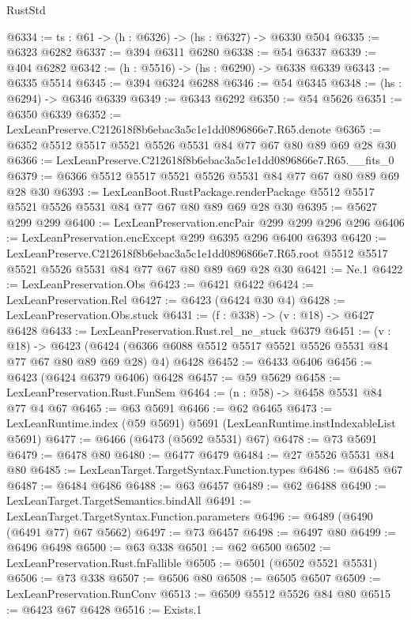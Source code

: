 \begin{lexlean}{RustStd}
\begin{coremodule}
@6334 := {ts : @61} -> (h : @6326) -> (hs : @6327) -> @6330 @504
@6335 := @6323 @6282
@6337 := @394 @6311 @6280
@6338 := @54 @6337
@6339 := @404 @6282
@6342 := (h : @5516) -> (hs : @6290) -> @6338 @6339
@6343 := @6335 @5514
@6345 := @394 @6324 @6288
@6346 := @54 @6345
@6348 := (hs : @6294) -> @6346 @6339
@6349 := @6343 @6292
@6350 := @54 @5626
@6351 := @6350 @6339
@6352 := LexLeanPreserve.C212618f8b6ebac3a5c1e1dd0896866e7.R65.denote
@6365 := @6352 @5512 @5517 @5521 @5526 @5531 @84 @77 @67 @80 @89 @69 @28 @30
@6366 := LexLeanPreserve.C212618f8b6ebac3a5c1e1dd0896866e7.R65.__fits_0
@6379 := @6366 @5512 @5517 @5521 @5526 @5531 @84 @77 @67 @80 @89 @69 @28 @30
@6393 := LexLeanBoot.RustPackage.renderPackage
    @5512
    @5517
    @5521
    @5526
    @5531
    @84
    @77
    @67
    @80
    @89
    @69
    @28
    @30
@6395 := @5627 @299 @299
@6400 := LexLeanPreservation.encPair @299 @299 @296 @296
@6406 := LexLeanPreservation.encExcept @299 @6395 @296 @6400 @6393
@6420 := LexLeanPreserve.C212618f8b6ebac3a5c1e1dd0896866e7.R65.root
    @5512
    @5517
    @5521
    @5526
    @5531
    @84
    @77
    @67
    @80
    @89
    @69
    @28
    @30
@6421 := Ne.{1}
@6422 := LexLeanPreservation.Obs
@6423 := @6421 @6422
@6424 := LexLeanPreservation.Rel
@6427 := @6423 (@6424 @30 @4)
@6428 := LexLeanPreservation.Obs.stuck
@6431 := (f : @338) -> (v : @18) -> @6427 @6428
@6433 := LexLeanPreservation.Rust.rel_ne_stuck @6379
@6451 := (v : @18) ->
  @6423 (@6424 (@6366 @6088 @5512 @5517 @5521 @5526 @5531 @84 @77 @67 @80 @89 @69 @28) @4) @6428
@6452 := @6433 @6406
@6456 := @6423 (@6424 @6379 @6406) @6428
@6457 := @59 @5629
@6458 := LexLeanPreservation.Rust.FunSem
@6464 := (n : @58) -> @6458 @5531 @84 @77 @4 @67
@6465 := @63 @5691
@6466 := @62 @6465
@6473 := LexLeanRuntime.index (@59 @5691) @5691 (LexLeanRuntime.instIndexableList @5691)
@6477 := @6466 (@6473 (@5692 @5531) @67)
@6478 := @73 @5691
@6479 := @6478 @80
@6480 := @6477 @6479
@6484 := @27 @5526 @5531 @84 @80
@6485 := LexLeanTarget.TargetSyntax.Function.types
@6486 := @6485 @67
@6487 := @6484 @6486
@6488 := @63 @6457
@6489 := @62 @6488
@6490 := LexLeanTarget.TargetSemantics.bindAll
@6491 := LexLeanTarget.TargetSyntax.Function.parameters
@6496 := @6489 (@6490 (@6491 @77) @67 @5662)
@6497 := @73 @6457
@6498 := @6497 @80
@6499 := @6496 @6498
@6500 := @63 @338
@6501 := @62 @6500
@6502 := LexLeanPreservation.Rust.fnFallible
@6505 := @6501 (@6502 @5521 @5531)
@6506 := @73 @338
@6507 := @6506 @80
@6508 := @6505 @6507
@6509 := LexLeanPreservation.RunConv
@6513 := @6509 @5512 @5526 @84 @80
@6515 := @6423 @67 @6428
@6516 := Exists.{1}

\end{coremodule}
\end{lexlean}

